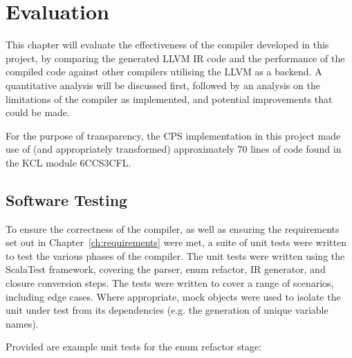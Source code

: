 \chapter{Evaluation}
\label{ch:evaluation}

This chapter will evaluate the effectiveness of the compiler developed in this project, by comparing
the generated LLVM IR code and the performance of the compiled code against other compilers
utilising the LLVM as a backend. A quantitative analysis will be discussed first, followed by an
analysis on the limitations of the compiler as implemented, and potential improvements that could be
made.

For the purpose of transparency, the CPS implementation in this project made use of (and
appropriately transformed) approximately 70 lines of code found in the KCL module 6CCS3CFL.

\section{Software Testing}

To ensure the correctness of the compiler, as well as ensuring the requirements set out in
Chapter~\ref{ch:requirements} were met, a suite of unit tests were written to test the various
phases of the compiler. The unit tests were written using the ScalaTest framework, covering the
parser, enum refactor, IR generator, and closure conversion steps. The tests were written to cover a
range of scenarios, including edge cases. Where appropriate, mock objects were used to isolate the
unit under test from its dependencies (e.g. the generation of unique variable names).

Provided are example unit tests for the enum refactor stage:

